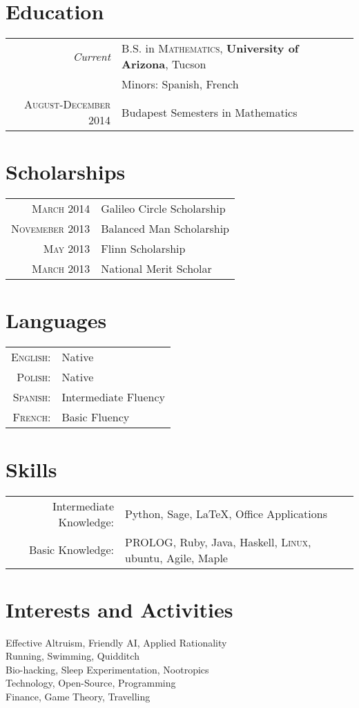 \documentclass[a4paper,10pt]{article}
\begin{document}
\section{Education}
\begin{tabular}{rl}	
	\emph{Current} & B.S. in \textsc{Mathematics}, \textbf{University of Arizona}, Tucson\\
		& Minors: Spanish, French\\
	\textsc{August-December} 2014& Budapest Semesters in Mathematics \\
\end{tabular}

\section{Scholarships} %
\begin{tabular}{rl}
	\textsc{March} 2014 & Galileo Circle Scholarship\\
	\textsc{Novemeber} 2013 & Balanced Man Scholarship\\
	\textsc{May} 2013 & Flinn Scholarship\\
	\textsc{March} 2013 & National Merit Scholar\\
\end{tabular}

\section{Languages}
\begin{tabular}{rl}
	\textsc{English:}&Native\\
	\textsc{Polish:}&Native\\
	\textsc{Spanish:}&Intermediate Fluency\\
	\textsc{French:}&Basic Fluency\\
\end{tabular}

\section{Skills}
\begin{tabular}{rl}
	Intermediate Knowledge:& Python, Sage, \LaTeX, Office Applications\\
	Basic Knowledge:& \textsc{PROLOG}, Ruby, Java, Haskell, \textsc{Linux}, ubuntu, Agile, Maple\\
\end{tabular}

\section{Interests and Activities}
Effective Altruism, Friendly AI, Applied Rationality\\
Running, Swimming, Quidditch\\
Bio-hacking, Sleep Experimentation, Nootropics\\
Technology, Open-Source, Programming\\
Finance, Game Theory, Travelling\\
\end{document}
